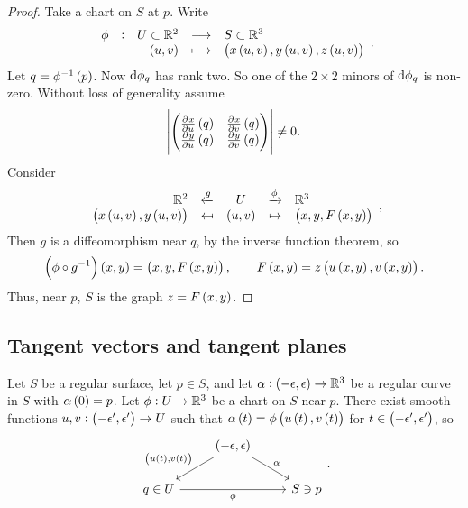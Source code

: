 \begin{proof}
Take a chart on $ S $ at $ p $. Write
$$ \function[\phi]{U \subset \RR^2}{S \subset \RR^3}{\br{u, v}}{\br{x\br{u, v}, y\br{u, v}, z\br{u, v}}}. $$
Let $ q = \phi^{-1}\br{p} $. Now $ \mathrm{d}\phi_q $ has rank two. So one of the $ 2 \times 2 $ minors of $ \mathrm{d}\phi_q $ is non-zero. Without loss of generality assume
$$ \abs{\twobytwo{\tpd{x}{u}\br{q}}{\tpd{x}{v}\br{q}}{\tpd{y}{u}\br{q}}{\tpd{y}{v}\br{q}}} \ne 0. $$
Consider
$$
\begin{array}{rcccl}
\RR^2 & \xleftarrow{g} & U & \xrightarrow{\phi} & \RR^3 \\
\br{x\br{u, v}, y\br{u, v}} & \mapsfrom & \br{u, v} & \mapsto & \br{x, y, F\br{x, y}}
\end{array},
$$
Then $ g $ is a diffeomorphism near $ q $, by the inverse function theorem, so
$$ \br{\phi \circ g^{-1}}\br{x, y} = \br{x, y, F\br{x, y}}, \qquad F\br{x, y} = z\br{u\br{x, y}, v\br{x, y}}. $$
Thus, near $ p $, $ S $ is the graph $ z = F\br{x, y} $.
\end{proof}

\pagebreak

\subsection{Tangent vectors and tangent planes}


\begin{proposition}
Let $ S $ be a regular surface, let $ p \in S $, and let $ \alpha : \br{-\epsilon, \epsilon} \to \RR^3 $ be a regular curve in $ S $ with $ \alpha\br{0} = p $. Let $ \phi : U \to \mathbb{R}^3 $ be a chart on $ S $ near $ p $. There exist smooth functions $ u, v : \br{-\epsilon', \epsilon'} \to U $ such that $ \alpha\br{t} = \phi\br{u\br{t}, v\br{t}} $ for $ t \in \br{-\epsilon', \epsilon'} $, so
$$
\begin{tikzcd}
& \br{-\epsilon, \epsilon} \arrow[swap]{dl}{\br{u\br{t}, v\br{t}}} \arrow{dr}{\alpha} & \\
q \in U \arrow[swap]{rr}{\phi} & & S \ni p
\end{tikzcd}.
$$
\end{proposition}

